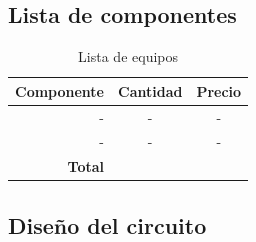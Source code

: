 \subsection*{Lista de componentes}

\begin{table}[H]
\caption{Lista de equipos}
\label{table_2}
\begin{center}
\begin{tabular}{r|cc}
\hline
\textbf{Componente}&\textbf{Cantidad}&\textbf{Precio}\\
 \hline
- &-  &- \\  
-& - &- \\ \hline
 \textbf{Total}& &  \\
 \hline
\end{tabular}
\end{center}
\end{table}

\subsection*{Diseño del circuito}

\newpage